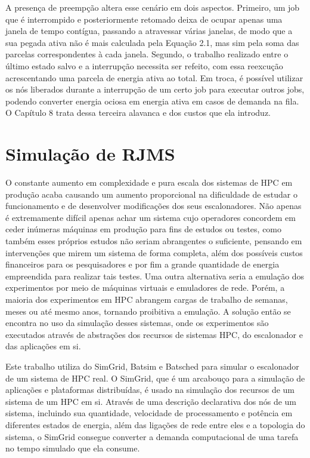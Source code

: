A presença de preempção altera esse cenário em dois aspectos. Primeiro, um job que é interrompido 
e posteriormente retomado deixa de ocupar apenas uma janela de tempo contígua, passando a atravessar
várias janelas, de modo que a sua pegada ativa não é mais calculada pela Equação 2.1, 
mas sim pela soma das parcelas correspondentes à cada janela. Segundo, o trabalho realizado entre o último
estado salvo e a interrupção necessita ser refeito, com essa reexcução acrescentando uma parcela de
energia ativa ao total. Em troca, é possível utilizar os nós liberados durante a interrupção de um 
certo job para executar outros jobs, podendo converter energia ociosa em energia ativa em casos de
demanda na fila. O Capítulo 8 trata dessa terceira alavanca e dos custos que ela introduz.

\section{Simulação de RJMS}
\label{sec:simulacao-rjms}

O constante aumento em complexidade e pura escala dos sistemas de HPC em produção acaba causando
um aumento proporcional na dificuldade de estudar o funcionamento e de desenvolver modificações
dos seus escalonadores. Não apenas é extremamente difícil apenas achar um sistema cujo operadores
concordem em ceder inúmeras máquinas em produção para fins de estudos ou testes, como também
esses próprios estudos não seriam abrangentes o suficiente, pensando em intervenções que mirem
um sistema de forma completa, além dos possíveis custos financeiros para os pesquisadores
e por fim a grande quantidade de energia empreendida para realizar tais testes. Uma outra alternativa
seria a emulação dos experimentos por meio de máquinas virtuais e emuladores de rede. 
Porém, a maioria dos experimentos em HPC abrangem cargas de trabalho de semanas, meses ou até mesmo anos,
tornando proibitiva a emulação. A solução então se encontra no uso da simulação desses sistemas, onde
os experimentos são executados através de abstrações dos recursos de sistemas HPC, do escalonador 
e das aplicações em si.  

Este trabalho utiliza do SimGrid, Batsim e Batsched para simular o escalonador de um sistema de HPC
real. O SimGrid, que é um arcabouço para a simulação de aplicações e plataformas distribuídas, é usado na simulação
dos recursos de um sistema de um HPC em si. Através de uma descrição declarativa dos nós de um sistema,
incluindo sua quantidade, velocidade de processamento e potência em diferentes estados de energia, além das ligações
de rede entre eles e a topologia do sistema, o SimGrid consegue converter a demanda computacional de uma
tarefa no tempo simulado que ela consume. 

